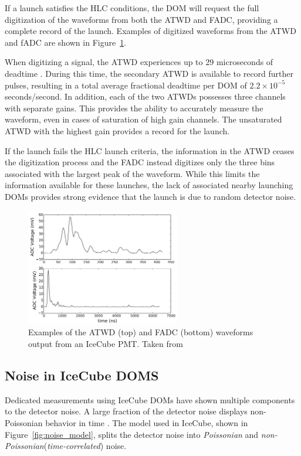 If a launch satisfies the HLC conditions, the DOM will request the full digitization of the waveforms from both the ATWD and FADC, providing a complete record of the launch.
Examples of digitized waveforms from the ATWD and fADC are shown in Figure~\ref{fig:waveforms}.

When digitizing a signal, the ATWD experiences up to 29 microseconds of deadtime \cite{Description-IceCube}. 
During this time, the secondary ATWD is available to record further pulses, resulting in a total average fractional deadtime per DOM of ${2.2 \times 10^{-5}}$ seconds/second.
In addition, each of the two ATWDs possesses three channels with separate gains.
This provides the ability to accurately measure the waveform, even in cases of saturation of high gain channels.
The unsaturated ATWD with the highest gain provides a record for the launch.

If the launch fails the HLC launch criteria, the information in the ATWD ceases the digitization process and the FADC instead digitizes only the three bins associated with the largest peak of the waveform.
While this limits the information available for these launches, the lack of associated nearby launching DOMs provides strong evidence that the launch is due to random detector noise.

\begin{figure}
\centering
\includegraphics[width=0.6\textwidth]{icecube_waveforms.png}
\caption[Examples of IceCube digitized waveforms]{Examples of the ATWD (top) and FADC (bottom) waveforms output from an IceCube PMT. Taken from \cite{Description-IceCube}}
\label{fig:waveforms}
\end{figure}

\subsection{Noise in IceCube DOMS}
\label{subsec:noise}
Dedicated measurements using IceCube DOMs have shown multiple components to the detector noise\cite{Thesis-Vuvuzela}. 
A large fraction of the detector noise displays non-Poissonian behavior in time \cite{Description-IceCube}.
The model used in IceCube, shown in Figure~\ref{fig:noise_model}, splits the detector noise into \emph{Poissonian} and \emph{non-Poissonian}(\emph{time-correlated}) noise.

